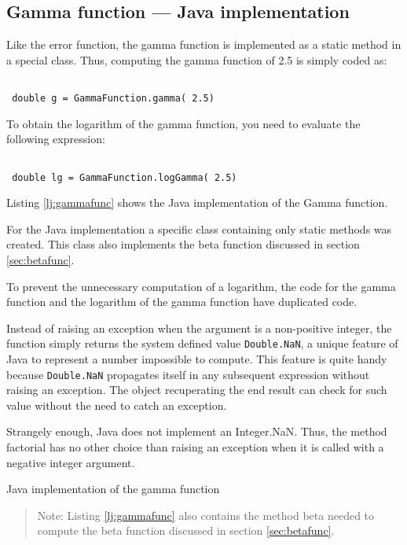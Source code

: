 \documentclass[twoside]{book}
\begin{document}
\subsection{Gamma function --- Java implementation}
 Like the error function, the gamma
function is implemented as a static method in a special class.
Thus, computing the gamma function of 2.5 is simply coded as:
\begin{codeExample}
\begin{verbatim}

 double g = GammaFunction.gamma( 2.5)
\end{verbatim}
\end{codeExample}
To obtain the logarithm of the gamma function, you need to
evaluate the following expression:
\begin{codeExample}
\begin{verbatim}

 double lg = GammaFunction.logGamma( 2.5)
\end{verbatim}
\end{codeExample}
Listing \ref{lj:gammafunc} shows the Java implementation of the
Gamma function.

For the Java implementation a specific class containing only
static methods was created. This class also implements the beta
function discussed in section \ref{sec:betafunc}.

To prevent the unnecessary computation of a logarithm, the code
for the gamma function and the logarithm of the gamma function
have duplicated code.

Instead of raising an exception when the argument is a
non-positive integer, the function simply returns the system
defined value {\tt Double.NaN}, a unique feature of Java to
represent a number impossible to compute. This feature is quite
handy because {\tt Double.NaN} propagates itself in any subsequent
expression without raising an exception. The object recuperating
the end result can check for such value without the need to catch
an exception.

Strangely enough, Java does not implement an Integer.NaN. Thus,
the method factorial has no other choice than raising an exception
when it is called with a negative integer argument.

\begin{listing}
Java implementation of the gamma function
\label{lj:gammafunc}

\end{listing}
\begin{quote}
Note: Listing \ref{lj:gammafunc} also contains the method beta
needed to compute the beta function discussed in section
\ref{sec:betafunc}.
\end{quote}
\end{document}
